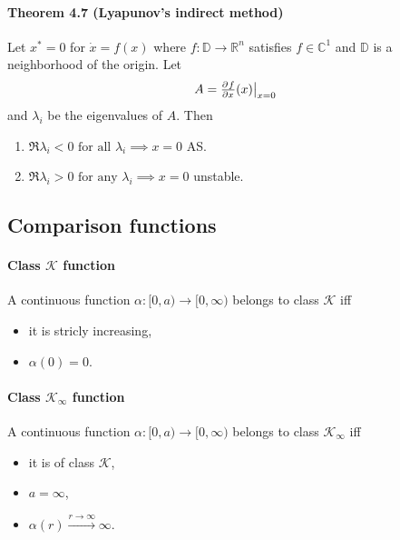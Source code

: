 \paragraph{Theorem 4.7 (Lyapunov's indirect method)}
Let $x^* = 0$ for $\dot{x} = f(x)$ where $f : \mathbb{D} \rightarrow \mathbb{R}^n$ satisfies $f \in \mathbb{C}^1$ and $\mathbb{D}$ is a neighborhood of the origin. Let
\begin{equation}
	A = \pd{f}{x} (x) \big\rvert_{x = 0}
\end{equation}
and $\lambda_i$ be the eigenvalues of $A$. Then
\begin{enumerate}
	\item $\Re \lambda_i < 0 \mbox{ for all } \lambda_i \implies x = 0$ AS.
	\item $\Re \lambda_i > 0 \mbox{ for any } \lambda_i \implies x = 0$ unstable.
\end{enumerate}

\subsection{Comparison functions}
\paragraph{Class $\mathcal{K}$ function}
A continuous function $\alpha : [0,a) \to [0, \infty)$ belongs to class $\mathcal{K}$ iff
\begin{itemize}
	\item it is stricly increasing,
	\item $\alpha(0) = 0$.
\end{itemize}

\paragraph{Class $\mathcal{K}_\infty$ function}
A continuous function $\alpha : [0,a) \to [0, \infty)$ belongs to class $\mathcal{K}_\infty$ iff
\begin{itemize}
	\item it is of class $\mathcal{K}$,
	\item $a = \infty$,
	\item $\alpha(r) \xrightarrow{r \to \infty} \infty$.
\end{itemize}

